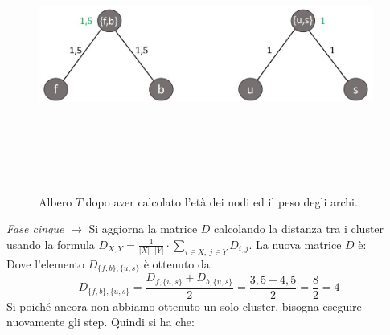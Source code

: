 \begin{figure}[h!]
\centering
	\includegraphics[height=9cm, width=11cm,keepaspectratio]{rooted_upgma_6.jpg}
 	\caption{Albero $T$ dopo aver calcolato l'età dei nodi ed il peso degli archi.}
  	\label{fig:rooted_upgma_6}
\end{figure}
\newline
\newline
\textit{Fase cinque} $\rightarrow$ Si aggiorna la matrice $D$ calcolando la distanza tra i cluster usando la formula $D_{X,Y}=\frac{1}{\left | X \right |\cdot \left | Y \right |} \cdot \sum_{i\in X,\: j\in Y}D_{i,j}$. La nuova matrice $D$ è:
\[
\
\]
Dove l'elemento $D_{\{f, b\}, \{u, s\}}$ è ottenuto da:
\[D_{\{f, b\}, \{u, s\}}=\frac{D_{f, \{u, s\}}+D_{b, \{u, s\}}}{2}=\frac{3,5+4,5}{2}=\frac{8}{2}=4\]
\newline
Si poiché ancora non abbiamo ottenuto un solo cluster, bisogna eseguire nuovamente gli step. Quindi si ha che:
